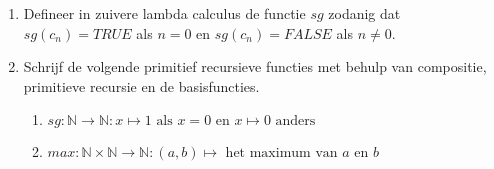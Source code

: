 \documentclass[a4paper]{article}
\begin{document}
\begin{enumerate}
	\item Defineer in zuivere lambda calculus de functie $sg$ zodanig dat $sg(c_n) = TRUE$ als $n = 0$ en $sg(c_n) = FALSE$ als $n \neq 0$.
   \item Schrijf de volgende primitief recursieve functies met behulp van compositie, primitieve recursie en de basisfuncties.
			\begin{enumerate}
				\item $sg : \mathbb{N} \to \mathbb{N} : x \mapsto 1 \text{ als $x = 0$ en $x \mapsto 0$ anders}$
				\item $max : \mathbb{N} \times \mathbb{N} \to \mathbb{N} : (a,b) \mapsto \text{ het maximum van $a$ en $b$}$
			\end{enumerate}
\end{enumerate}
\end{document}

